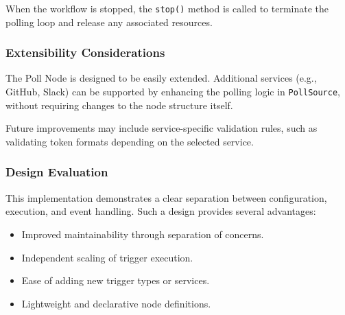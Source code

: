 When the workflow is stopped, the \texttt{stop()} method is called to terminate the polling loop and release any associated resources.

\subsubsection{Extensibility Considerations}

The Poll Node is designed to be easily extended. Additional services (e.g., GitHub, Slack) can be supported by enhancing the polling logic in \texttt{PollSource}, without requiring changes to the node structure itself.

Future improvements may include service-specific validation rules, such as validating token formats depending on the selected service.

\subsubsection{Design Evaluation}

This implementation demonstrates a clear separation between configuration, execution, and event handling. Such a design provides several advantages:

\begin{itemize}
    \item Improved maintainability through separation of concerns.
    \item Independent scaling of trigger execution.
    \item Ease of adding new trigger types or services.
    \item Lightweight and declarative node definitions.
\end{itemize}

